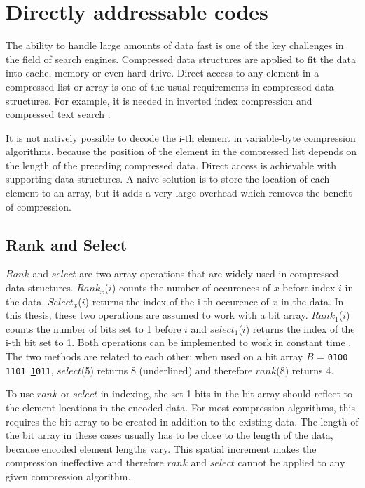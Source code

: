 \chapter{Directly addressable codes} \label{chapter:DAC}

The ability to handle large amounts of data fast is one of the key challenges in the field of search engines. Compressed data structures are applied to fit the 
data into cache, memory or even hard drive. Direct access to any element in a compressed list or array is one of the usual requirements in compressed data 
structures. For example, it is needed in inverted index compression \citep{Cul07} and compressed text search \citep{Mou00}.

It is not natively possible to decode the i-th element in variable-byte compression algorithms, because the position of the element in the compressed
list depends on the length of the preceding compressed data. Direct access is achievable with supporting data structures. A naive solution is to store the location 
of each element to an array, but it adds a very large overhead which removes the benefit of compression.

\section{Rank and Select}
$Rank$ and $select$ are two array operations that are widely used in compressed data structures. $Rank_x$($i$) counts the number of occurences of $x$ before index $i$ in the data. $Select_x$($i$) returns the index of the i-th 
occurence of $x$ in the data. In this thesis, these two operations are assumed to work with a bit array. $Rank_1$($i$) counts the number of bits set to 1 before $i$ and $select_1$($i$) returns the index 
of the i-th bit set to 1. Both operations can be implemented to work in constant time \citep[see, e.g.,][]{gbmp2014sea}. The two methods are related to each other: when used on a bit array 
$B$ = \texttt{0100 1101 \underline{1}011}, $select$(5) returns 8 (underlined) and therefore $rank$(8) returns 4. 

To use $rank$ or $select$ in indexing, the set 1 bits in the bit array should reflect to the element locations in the encoded data. For most compression algorithms, this requires the bit array to be 
created in addition to the existing data. The length of the bit array in these cases usually has to be close to the length of the data, because encoded element lengths vary. This spatial increment makes 
the compression ineffective and therefore $rank$ and $select$ cannot be applied to any given compression algorithm.

